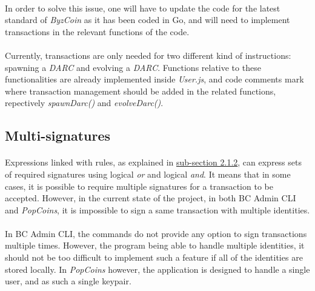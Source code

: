 \paragraph{}

In order to solve this issue, one will have to update the code for the latest standard of \textit{ByzCoin} as it has been coded in Go, and will need to implement transactions in the relevant functions of the code.

\paragraph{}

Currently, transactions are only needed for two different kind of instructions: spawning a \textit{DARC} and evolving a \textit{DARC}. Functions relative to these functionalities are already implemented inside \textit{User.js}, and code comments mark where transaction management should be added in the related functions, repectively \textit{spawnDarc()} and \textit{evolveDarc()}.

\subsection{Multi-signatures}

\paragraph{}

Expressions linked with rules, as explained in \hyperref[subsection212]{sub-section 2.1.2}, can express sets of required signatures using logical \textit{or} and logical \textit{and}. It means that in some cases, it is possible to require multiple signatures for a transaction to be accepted. However, in the current state of the project, in both BC Admin CLI and \textit{PopCoins}, it is impossible to sign a same transaction with multiple identities.

\paragraph{}

In BC Admin CLI, the commands do not provide any option to sign transactions multiple times. However, the program being able to handle multiple identities, it should not be too difficult to implement such a feature if all of the identities are stored locally. In \textit{PopCoins} however, the application is designed to handle a single user, and as such a single keypair.


